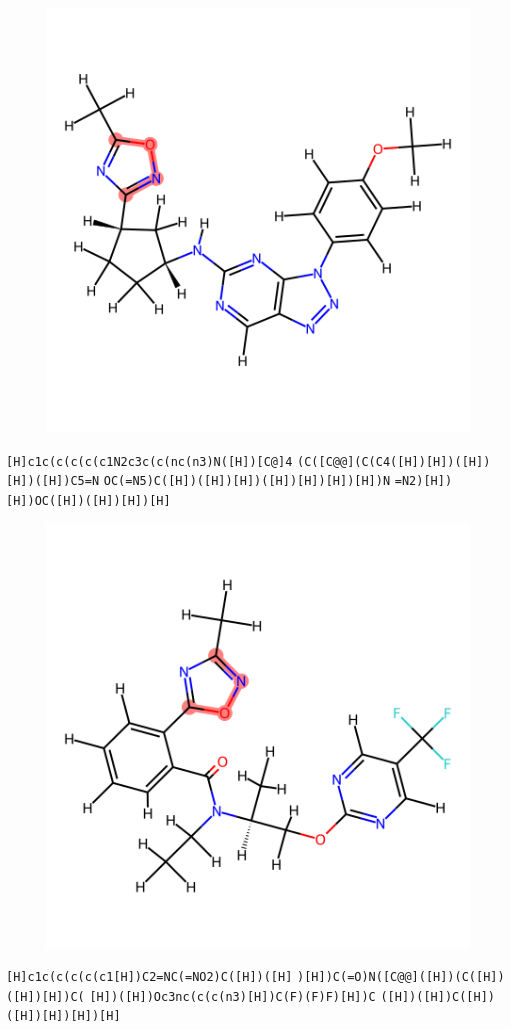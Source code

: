 \documentclass{article}
\begin{document}
\begin{figure}[ht]
\centering
    \includegraphics{mol272.png}
\end{figure}
\verb|[H]c1c(c(c(c(c1N2c3c(c(nc(n3)N([H])[C@]4| \verb|(C([C@@](C(C4([H])[H])([H])[H])([H])C5=N| \verb|OC(=N5)C([H])([H])[H])([H])[H])[H])[H])N| \verb|=N2)[H])[H])OC([H])([H])[H])[H]|

\begin{figure}[ht]
\centering
    \includegraphics{mol273.png}
\end{figure}
\verb|[H]c1c(c(c(c(c1[H])C2=NC(=NO2)C([H])([H]| \verb|)[H])C(=O)N([C@@]([H])(C([H])([H])[H])C(| \verb|[H])([H])Oc3nc(c(c(n3)[H])C(F)(F)F)[H])C| \verb|([H])([H])C([H])([H])[H])[H])[H]|
\end{document}
